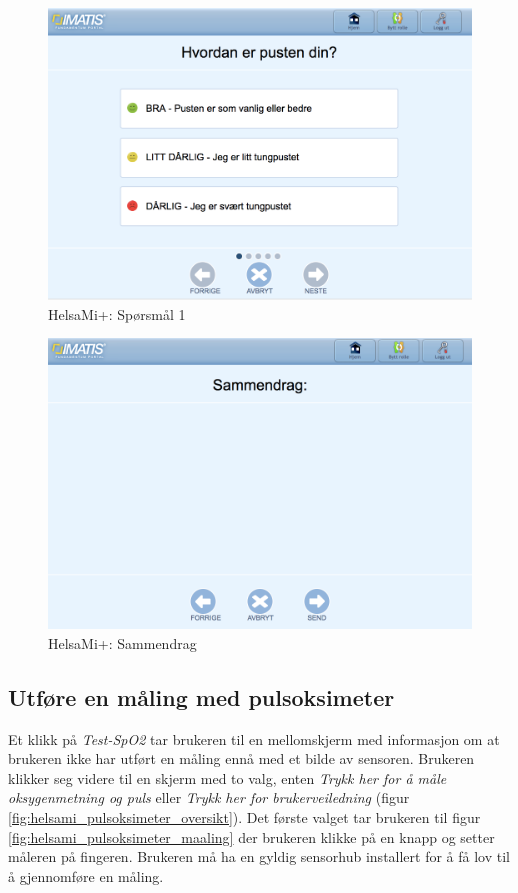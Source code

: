 \begin{figure}
\includegraphics[width=1.0\textwidth,center]{fig/helsami/kols_sp1}
\caption{HelsaMi+: Spørsmål 1}
\label{fig:helsami_kols_sp1}
\end{figure}

\begin{figure}
\includegraphics[width=1.0\textwidth,center]{fig/helsami/kols_sammendrag}
\caption{HelsaMi+: Sammendrag}
\label{fig:helsami_kols_sammendrag}
\end{figure}

\subsection{Utføre en måling med pulsoksimeter}
Et klikk på \textit{Test-SpO2} tar brukeren til en mellomskjerm med informasjon om at
brukeren ikke har utført en måling ennå med et bilde av sensoren. Brukeren klikker seg videre
til en skjerm med to valg, enten \textit{Trykk her for å måle oksygenmetning og puls} eller \textit{Trykk her for brukerveiledning}
(figur \ref{fig:helsami_pulsoksimeter_oversikt}). Det første valget tar brukeren til figur \ref{fig:helsami_pulsoksimeter_maaling}
der brukeren klikke på en knapp og setter måleren på fingeren. Brukeren må ha en gyldig sensorhub installert for
å få lov til å gjennomføre en måling.

